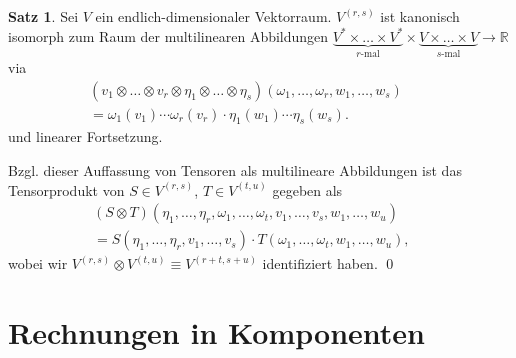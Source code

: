\documentclass[a4paper]{scrreprt}
\numberwithin{equation}{chapter}
\newcommand{\R}{\mathbb{R}}
\theoremstyle{definition}
\newtheorem{satz}[defn]{Satz}
\begin{document}
\begin{satz} \label{satz:tensorprod_multilin}
	Sei $V$ ein endlich-dimensionaler Vektorraum. $V^{(r,s)}$ ist kanonisch isomorph zum Raum der multilinearen Abbildungen $\underbrace{V^* \times \dots \times V^*}_\text{$r$-mal} \times \underbrace{V \times \dots \times V}_\text{$s$-mal} \to \R$ via
	\begin{align*}
		(v_1 \otimes \dots \otimes v_r \otimes \eta_1 \otimes \dots \otimes \eta_s ) (\omega_1,\dots,\omega_r, w_1,\dots,w_s) \qquad \\ = \omega_1(v_1)\cdots\omega_r(v_r) \cdot \eta_1(w_1)\cdots\eta_s(w_s).
	\end{align*}
	und linearer Fortsetzung.

	Bzgl. dieser Auffassung von Tensoren als multilineare Abbildungen ist das Tensorprodukt von $S \in V^{(r,s)}$, $T \in V^{(t,u)}$ gegeben als
	\begin{align*}
		(S\otimes T)(\eta_1,\dots,\eta_r, \omega_1,\dots,\omega_t, v_1,\dots,v_s, w_1,\dots,w_u) \qquad \\ = S(\eta_1,\dots,\eta_r, v_1,\dots,v_s) \cdot T(\omega_1,\dots,\omega_t, w_1,\dots,w_u) ,
	\end{align*}
	wobei wir $V^{(r,s)} \otimes V^{(t,u)} \equiv V^{(r+t, s+u)}$ identifiziert haben. \qed
\end{satz}

\section{Rechnungen in Komponenten}
\end{document}
